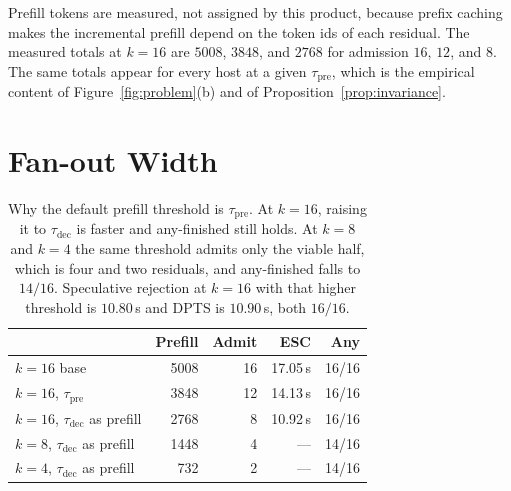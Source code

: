 Prefill tokens are measured, not assigned by this product, because prefix caching makes the incremental prefill depend on the token ids of each residual.
The measured totals at $k{=}16$ are $5008$, $3848$, and $2768$ for admission $16$, $12$, and $8$.
The same totals appear for every host at a given $\tau_{\mathrm{pre}}$, which is the empirical content of Figure~\ref{fig:problem}(b) and of Proposition~\ref{prop:invariance}.

\section{Fan-out Width}
\label{app:width}

\begin{table}[h]
\centering
\small
\setlength{\tabcolsep}{3.2pt}
\caption{ESC across fan-out width at the default prefill threshold.
The relative saving grows with $k$ because more loop residuals are withheld.
At $k{=}4$ any-finished drops by one problem.
At $k{=}8$ any-finished holds and the winner moves by two.}
\label{tab:esc-width}
\end{table}

\begin{table}[h]
\centering
\small
\setlength{\tabcolsep}{3.5pt}
\begin{tabular}{@{}lrrrr@{}}
\toprule
 & Prefill & Admit & ESC & Any \\
\midrule
$k{=}16$ base & 5008 & 16 & 17.05\,s & 16/16 \\
$k{=}16$, $\tau_{\mathrm{pre}}$ & 3848 & 12 & 14.13\,s & 16/16 \\
$k{=}16$, $\tau_{\mathrm{dec}}$ as prefill & 2768 & 8 & 10.92\,s & 16/16 \\
$k{=}8$, $\tau_{\mathrm{dec}}$ as prefill & 1448 & 4 & --- & 14/16 \\
$k{=}4$, $\tau_{\mathrm{dec}}$ as prefill & 732 & 2 & --- & 14/16 \\
\bottomrule
\end{tabular}
\caption{Why the default prefill threshold is $\tau_{\mathrm{pre}}$.
At $k{=}16$, raising it to $\tau_{\mathrm{dec}}$ is faster and any-finished still holds.
At $k{=}8$ and $k{=}4$ the same threshold admits only the viable half, which is four and two residuals, and any-finished falls to $14/16$.
Speculative rejection at $k{=}16$ with that higher threshold is $10.80$\,s and DPTS is $10.90$\,s, both $16/16$.}
\label{tab:why-015}
\end{table}

